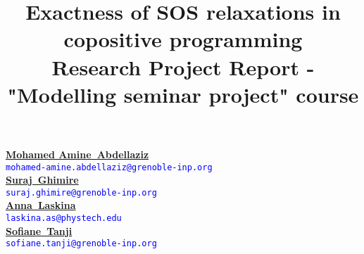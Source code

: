 \documentclass[onecolumn,11pt,a4paper]{article}
\theoremstyle{plain}  %
\theoremstyle{remark}  %
\providecommand*{\hr}[1][class-arg]{%
    \hspace*{\fill}\hrulefill\hspace*{\fill}
    \vskip 0.65\baselineskip
}
\begin{document}
\large
\title{\vspace*{10pt}\Huge{\textbf{Exactness of SOS relaxations in copositive programming}}\\ \vspace*{15pt} \Large{Research Project Report - "Modelling seminar project" course} }
\thispagestyle{plain}
\date{}
\author{}
\maketitle
\hr{}
\renewcommand{\thefootnote}{\fnsymbol{footnote}}
\begin{Large}
\begin{center}
		\href{mailto:Mohamed-Amine.Abdellaziz@grenoble-inp.org}{\textbf{Mohamed Amine~Abdellaziz}}\\
		\textcolor{blue}{\texttt{{mohamed-amine}{.}{abdellaziz}{{@}}{grenoble-inp}{.}{org}}}\\
		\href{mailto:suraj.ghimire@grenoble-inp.org}{\textbf{Suraj~Ghimire}}\\
    	\textcolor{blue}{\texttt{{suraj}{.}{ghimire}{{@}}{grenoble-inp}{.}{org}}}\\
		\href{mailto:laskina.as@phystech.edu}{\textbf{Anna~Laskina}}\\
    	\textcolor{blue}{\texttt{{laskina}{.}{as}{{@}}{phystech}{.}{edu}}}\\
    	\href{mailto:sofiane.tanji@grenoble-inp.org}{\textbf{Sofiane~Tanji}}\\
		\textcolor{blue}{\texttt{{sofiane}{.}{tanji}{{@}}{grenoble-inp}{.}{org}}}\\
\end{center}
\end{Large}
\renewcommand{\thefootnote}{\arabic{footnote}}
\setcounter{footnote}{0}  %
\hr{}
\end{document}

